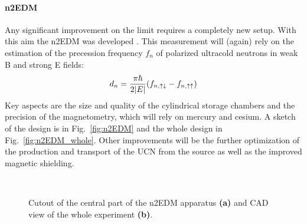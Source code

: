 \begin{refsection}
            \paragraph{n2EDM} Any significant improvement on the limit requires a completely new setup. With this aim the n2EDM was developed \cite{n2EDM}.
            This measurement will (again) rely on the estimation of the precession frequency $f_n$ of polarized ultracold neutrons in weak B and strong E fields:
            $$d_n = \frac{\pi\hbar}{2\abs{E}}(f_{n, \uparrow\downarrow}-f_{n, \uparrow\uparrow})$$
            Key aspects are the size and quality of the cylindrical storage chambers and the precision of the magnetometry, which will rely on mercury and cesium.
            A sketch of the design is in Fig.~\ref{fig:n2EDM} and the whole design in Fig.~\ref{fig:n2EDM_whole}.
            Other improvements will be the further optimization of the production and transport of the UCN from the source as well as the improved magnetic shielding.\\

            \begin{figure}
                \centering
                \\
                \caption[EDM: n2EDM experiment]{Cutout of the central part of the n2EDM apparatus \textbf{(a)} and CAD view of the whole experiment \textbf{(b)}.}
            \end{figure}     
            

\end{refsection}
